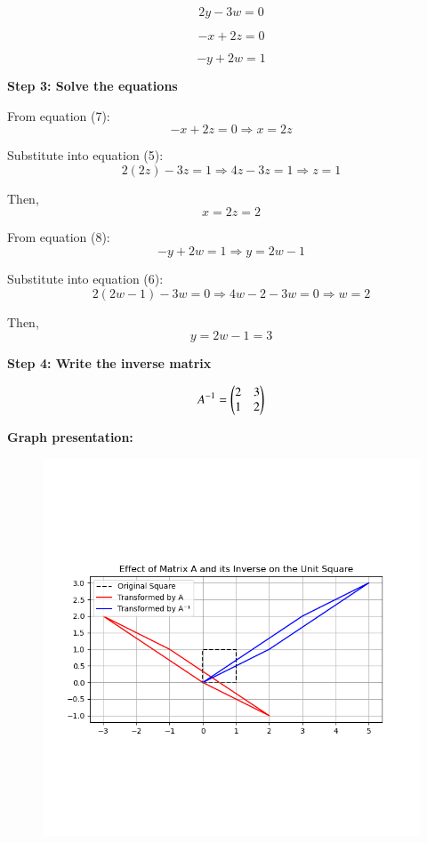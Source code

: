 \documentclass[journal]{IEEEtran}
\begin{document}
\begin{equation}
2y - 3w = 0
\end{equation}

\begin{equation}
-x + 2z = 0
\end{equation}

\begin{equation}
-y + 2w = 1
\end{equation}

\textbf{Step 3: Solve the equations}

From equation (7):
\begin{equation}
-x + 2z = 0 \Rightarrow x = 2z
\end{equation}

Substitute into equation (5):
\begin{equation}
2(2z) - 3z = 1 \Rightarrow 4z - 3z = 1 \Rightarrow z = 1
\end{equation}

Then,
\begin{equation}
x = 2z = 2
\end{equation}

From equation (8):
\begin{equation}
-y + 2w = 1 \Rightarrow y = 2w - 1
\end{equation}

Substitute into equation (6):
\begin{equation}
2(2w - 1) - 3w = 0 \Rightarrow 4w - 2 - 3w = 0 \Rightarrow w = 2
\end{equation}

Then,
\begin{equation}
y = 2w - 1 = 3
\end{equation}

\textbf{Step 4: Write the inverse matrix}

\begin{equation}
A^{-1} = \begin{pmatrix}2 & 3 \\ 1 & 2\end{pmatrix}
\end{equation}

\textbf{Graph presentation:}
\begin{figure}[H]
\begin{center}
\includegraphics[width=0.6\columnwidth]{Figs/fig11.png}
\end{center}
\caption{}
\label{fig:Fig}
\end{figure}
\end{document}

